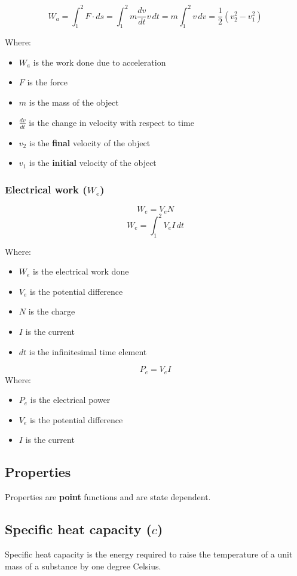 \documentclass[11pt]{article}
\begin{document}
\[W_a = \int_1^2 F \cdot ds = \int_1^2 m \frac{dv}{dt} v \, dt = m \int_1^2 v \, dv = \frac{1}{2} \left(v_2^2 - v_1^2 \right)\]

Where:
\begin{itemize}
\item \(W_a\) is the work done due to acceleration
\item \(F\) is the force
\item \(m\) is the mass of the object
\item \(\frac{dv}{dt}\) is the change in velocity with respect to time
\item \(v_2\) is the \textbf{final} velocity of the object
\item \(v_1\) is the \textbf{initial} velocity of the object
\end{itemize}

\newpage
\subsubsection{Electrical work (\(W_e\))}
\label{sec:org111a106}
\[W_e = V_e N\]
\[W_e = \int_1^2 V_e I \, dt\]

Where:
\begin{itemize}
\item \(W_e\) is the electrical work done
\item \(V_e\) is the potential difference
\item \(N\) is the charge
\item \(I\) is the current
\item \(dt\) is the infinitesimal time element
\end{itemize}

\[P_e = V_e I\]
Where:
\begin{itemize}
\item \(P_e\) is the electrical power
\item \(V_e\) is the potential difference
\item \(I\) is the current
\end{itemize}
\subsection{Properties}
\label{sec:org2c1b5a1}
Properties are \textbf{point} functions and are state dependent.
\subsection{Specific heat capacity (\(c\))}
\label{sec:org5b5cce3}
Specific heat capacity is the energy required to raise the temperature of a unit mass of a substance by one degree Celsius.
\end{document}
